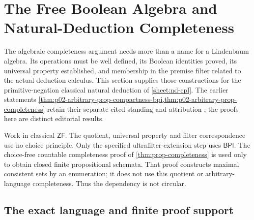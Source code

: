 \section{The Free Boolean Algebra and Natural-Deduction Completeness}
\label{sec:p02-free-boolean-completeness}

The algebraic completeness argument needs more than a name for a
Lindenbaum algebra. Its operations must be well defined, its Boolean
identities proved, its universal property established, and membership
in the premise filter related to the actual deduction calculus.
This section supplies those constructions for the primitive-negation
classical natural deduction of \cref{sheet:nd-cpl}.
The earlier statements
\cref{thm:p02-arbitrary-prop-compactness-bpi,thm:p02-arbitrary-prop-completeness}
retain their separate cited standing and attribution
\parencite{HowardRubin1998}; the proofs here are distinct editorial results.

Work in classical \(\mathsf{ZF}\). The quotient, universal property and
filter correspondence use no choice principle. Only the specified
ultrafilter-extension step uses \(\mathsf{BPI}\).
The choice-free countable completeness proof of
\cref{thm:prop-completeness} is used only to obtain closed finite
propositional schemata. That proof constructs maximal consistent sets by
an enumeration; it does not use this quotient or arbitrary-language
completeness. Thus the dependency is not circular.

\subsection{The exact language and finite proof support}
\label{sec:p02-fbc-syntax}

